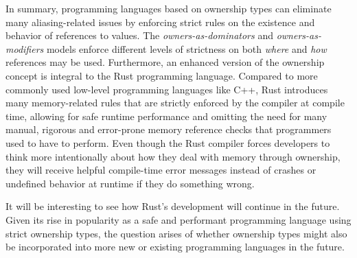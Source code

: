 \documentclass[sigplan,11pt,nonacm]{acmart}
\begin{document}
In summary, programming languages based on ownership types can eliminate many aliasing-related issues by enforcing strict rules on the existence and behavior of references to values.
The \emph{owners-as-dominators} and \emph{owners-as-modifiers} models enforce different levels of strictness on both \emph{where} and \emph{how} references may be used.
Furthermore, an enhanced version of the ownership concept is integral to the Rust programming language.
Compared to more commonly used low-level programming languages like C++, Rust introduces many memory-related rules that are strictly enforced by the compiler at compile time, allowing for safe runtime performance and omitting the need for many manual, rigorous and error-prone memory reference checks that programmers used to have to perform.
Even though the Rust compiler forces developers to think more intentionally about how they deal with memory through ownership, they will receive helpful compile-time error messages instead of crashes or undefined behavior at runtime if they do something wrong.

It will be interesting to see how Rust's development will continue in the future.
Given its rise in popularity as a safe and performant programming language using strict ownership types, the question arises of whether ownership types might also be incorporated into more new or existing programming languages in the future.



\end{document}
